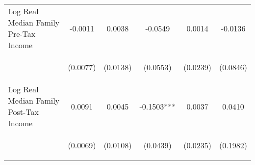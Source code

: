 \begin{center}
\begin{tabular}{lccccc}
\noalign{\smallskip}Log Real Median Family Pre-Tax Income & \begin{scriptsize}-0.0011\end{scriptsize} & \begin{scriptsize}0.0038\end{scriptsize} & \begin{scriptsize}-0.0549\end{scriptsize} & \begin{scriptsize}0.0014\end{scriptsize} & \begin{scriptsize}-0.0136\end{scriptsize}\\
 & \begin{scriptsize}(0.0077)\end{scriptsize} & \begin{scriptsize}(0.0138)\end{scriptsize} & \begin{scriptsize}(0.0553)\end{scriptsize} & \begin{scriptsize}(0.0239)\end{scriptsize} & \begin{scriptsize}(0.0846)\end{scriptsize}\\
\noalign{\smallskip}Log Real Median Family Post-Tax Income & \begin{scriptsize}0.0091\end{scriptsize} & \begin{scriptsize}0.0045\end{scriptsize} & \begin{scriptsize}-0.1503***\end{scriptsize} & \begin{scriptsize}0.0037\end{scriptsize} & \begin{scriptsize}0.0410\end{scriptsize}\\
 & \begin{scriptsize}(0.0069)\end{scriptsize} & \begin{scriptsize}(0.0108)\end{scriptsize} & \begin{scriptsize}(0.0439)\end{scriptsize} & \begin{scriptsize}(0.0235)\end{scriptsize} & \begin{scriptsize}(0.1982)\end{scriptsize}\\

\end{tabular}
\end{center}
